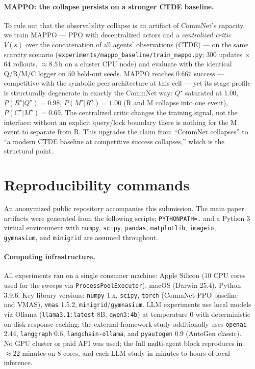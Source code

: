 \documentclass{article}
\newcommand{\method}[1]{\texttt{#1}}
\begin{document}
\paragraph{MAPPO: the collapse persists on a stronger CTDE baseline.}
To rule out that the observability collapse is an artifact of CommNet's
capacity, we train MAPPO \citep{yu2022mappo} --- PPO with decentralized actors
and a \emph{centralized critic} $V(s)$ over the concatenation of all agents'
observations (CTDE) --- on the same scarcity scenario
(\method{experiments/mappo\_baseline/train\_mappo.py}; $300$ updates
$\times$ $64$ rollouts, $\approx8.5$\,h on a cluster CPU node) and evaluate with
the identical Q/R/M/C logger on $50$ held-out seeds. MAPPO reaches $0.667$
success --- competitive with the symbolic peer architecture at this cell ---
yet its stage profile is structurally degenerate in exactly the CommNet way:
$Q^\star$ saturated at $1.00$, $P(R^\star|Q^\star){=}0.98$,
$P(M^\star|R^\star){=}1.00$ (R and M collapse into one event),
$P(C^\star|M^\star){=}0.69$. The centralized critic changes the training
signal, not the interface: without an explicit query/lock boundary there is
nothing for the M event to separate from R. This upgrades the claim from
``CommNet collapses'' to ``a modern CTDE baseline at competitive success
collapses,'' which is the structural point.

\section{Reproducibility commands}
\label{app:repro}

An anonymized public repository accompanies this submission. The main paper artifacts were generated from the following scripts; \texttt{PYTHONPATH=.} and a Python 3 virtual environment with \texttt{numpy}, \texttt{scipy}, \texttt{pandas}, \texttt{matplotlib}, \texttt{imageio}, \texttt{gymnasium}, and \texttt{minigrid} are assumed throughout.

\paragraph{Computing infrastructure.} All experiments ran on a single
consumer machine: Apple Silicon (10 CPU cores used for the sweeps via
\texttt{ProcessPoolExecutor}), macOS (Darwin 25.4), Python 3.9.6.
Key library versions: \texttt{numpy} 1.x, \texttt{scipy},
\texttt{torch} (CommNet-PPO baseline and VMAS), \texttt{vmas} 1.5.2,
\texttt{minigrid}/\texttt{gymnasium}. LLM experiments use local
models via Ollama (\texttt{llama3.1:latest} 8B, \texttt{qwen3:4b}) at
temperature $0$ with deterministic on-disk response caching; the
external-framework study additionally uses \texttt{openai} 2.44,
\texttt{langgraph} 0.6, \texttt{langchain-ollama}, and
\texttt{pyautogen} 0.9 (AutoGen classic). No GPU cluster or paid API
was used; the full multi-agent block reproduces in ${\approx}22$
minutes on 8 cores, and each LLM study in minutes-to-hours of local
inference.
\end{document}
